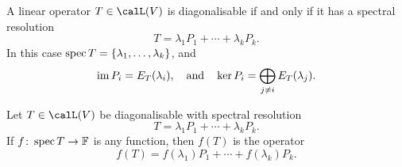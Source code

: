 \begin{propositionnoproof}
    A linear operator $T \in \lin(V)$ is diagonalisable if and only if it has a spectral resolution
    \begin{equation*}
        T
            = \lambda_1 P_1 + \cdots + \lambda_k P_k.
    \end{equation*}
    In this case $\operatorname{spec} T = \{\lambda_1, \ldots, \lambda_k\}$, and
    \begin{equation*}
        \operatorname{im} P_i = E_T(\lambda_i),
        \quad \text{and} \quad
        \ker P_i = \bigoplus_{j \neq i} E_T(\lambda_j).
    \end{equation*}
\end{propositionnoproof}


\begin{definition}
    Let $T \in \lin(V)$ be diagonalisable with spectral resolution
    \begin{equation*}
        T = \lambda_1 P_1 + \cdots + \lambda_k P_k.
    \end{equation*}
    If $f \colon \operatorname{spec} T \to \mathbb{F}$ is any function, then $f(T)$ is the operator
    \begin{equation*}
        f(T) = f(\lambda_1) P_1 + \cdots + f(\lambda_k) P_k.
    \end{equation*}
\end{definition}

